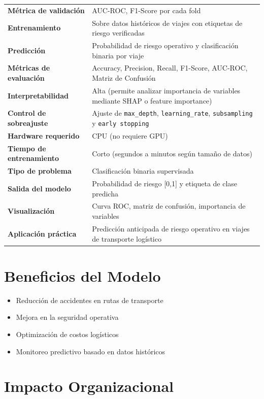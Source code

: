 \documentclass[12pt]{article}
\begin{document}
\begin{longtable}{>{\bfseries\color{white}\columncolor{headerblue}}p{5.5cm} p{9cm}}
Métrica de validación & AUC-ROC, F1-Score por cada fold \\
\rowcolor{rowgray}
Entrenamiento & Sobre datos históricos de viajes con etiquetas de riesgo verificadas \\
Predicción & Probabilidad de riesgo operativo y clasificación binaria por viaje \\
\rowcolor{rowgray}
Métricas de evaluación & Accuracy, Precision, Recall, F1-Score, AUC-ROC, Matriz de Confusión \\
Interpretabilidad & Alta (permite analizar importancia de variables mediante SHAP o feature importance) \\
\rowcolor{rowgray}
Control de sobreajuste & Ajuste de \texttt{max\_depth}, \texttt{learning\_rate}, \texttt{subsampling} y \texttt{early stopping} \\
Hardware requerido & CPU (no requiere GPU) \\
\rowcolor{rowgray}
Tiempo de entrenamiento & Corto (segundos a minutos según tamaño de datos) \\
Tipo de problema & Clasificación binaria supervisada \\
\rowcolor{rowgray}
Salida del modelo & Probabilidad de riesgo [0,1] y etiqueta de clase predicha \\
Visualización & Curva ROC, matriz de confusión, importancia de variables \\
\rowcolor{rowgray}
Aplicación práctica & Predicción anticipada de riesgo operativo en viajes de transporte logístico \\
\end{longtable}

\section{Beneficios del Modelo}

\begin{itemize}
    \item Reducción de accidentes en rutas de transporte
    \item Mejora en la seguridad operativa
    \item Optimización de costos logísticos
    \item Monitoreo predictivo basado en datos históricos
\end{itemize}

\section{Impacto Organizacional}
\end{document}
